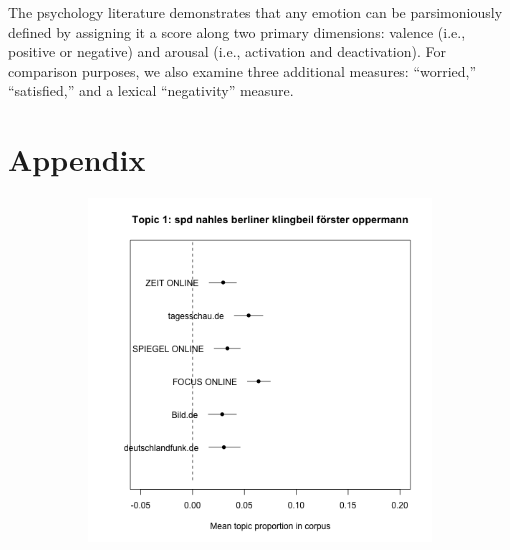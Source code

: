 \documentclass[12pt,a4paper,notitlepage]{article}
\begin{document}
The psychology literature demonstrates that any emotion can be parsimoniously defined by assigning it a score along two primary dimensions: valence (i.e., positive or negative) and arousal (i.e., activation and deactivation). For comparison purposes, we also examine three additional measures: “worried,” “satisfied,” and a lexical “negativity” measure. 

\section*{Appendix}

\begin{figure}[H]
	\caption{Mean prevalence of topics within each news source corpus 1}
	\begin{center}
		\begin{subfigure}[normla]{0.2\textwidth}
			\includegraphics[width=\textwidth]{../figs/estimate_effect1.png}
		\end{subfigure}
		\begin{subfigure}[normla]{0.2\textwidth}

\end{subfigure}
\end{center}
\end{figure}
\end{document}
